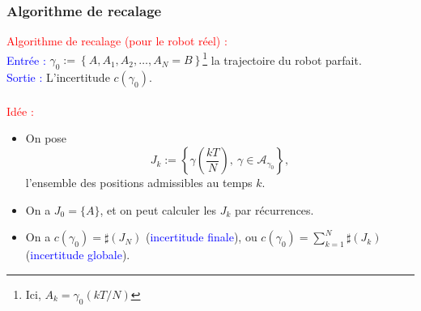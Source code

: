 \documentclass[11pt]{beamer}
\begin{document}
\begin{frame}

\frametitle{Algorithme de recalage}


\textcolor{red}{Algorithme de recalage (pour le robot réel) :}\\
\indent \textcolor{blue}{Entrée : } $\gamma_0 := \left\{ A, A_1, A_2, \ldots, A_N = B \right\}$\footnote{Ici, $A_k = \gamma_0(kT/N)$} la trajectoire du robot parfait.\\
\indent \textcolor{blue}{Sortie : } L'incertitude $c(\gamma_0)$.\\
~\\

\textcolor{red}{Idée :}
\begin{itemize}
	\item On pose 
	\[
		J_k := \left\{ \gamma \left(\dfrac{kT}{N} \right), \ \gamma \in \mathcal{A}_{\gamma_0} \right\},
	\]
	l'ensemble des positions admissibles au temps $k$.
	\item On a $J_0 = \{ A \}$, et on peut calculer les $J_k$ par récurrences.
	\item On a $c(\gamma_0) = \sharp \left( J_N \right)$ (\textcolor{blue}{incertitude finale}), ou $c(\gamma_0) = \sum_{k=1}^N \sharp \left( J_k \right)$ (\textcolor{blue}{incertitude globale}).
\end{itemize}



\end{frame}



\end{document}
